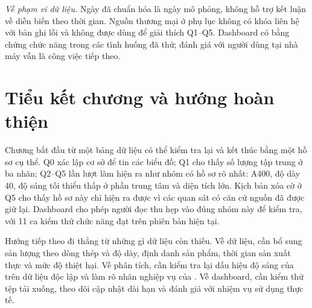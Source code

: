 \emph{Về phạm vi dữ liệu.} Ngày đã chuẩn hóa là ngày mô phỏng, không hỗ trợ kết luận về diễn biến theo thời gian. Nguồn thương mại ở phụ lục không có khóa liên hệ với bản ghi lỗi và không được dùng để giải thích Q1--Q5. Dashboard có bằng chứng chức năng trong các tình huống đã thử; đánh giá với người dùng tại nhà máy vẫn là công việc tiếp theo.

\section{Tiểu kết chương và hướng hoàn thiện}

Chương bắt đầu từ một bảng dữ liệu có thể kiểm tra lại và kết thúc bằng một hồ sơ cụ thể. Q0 xác lập cơ sở để tin các biểu đồ; Q1 cho thấy số lượng tập trung ở ba nhãn; Q2--Q5 lần lượt làm hiện ra  như nhóm có hồ sơ rõ nhất: A400, độ dày 40, độ sáng tối thiểu thấp ở phần trung tâm và diện tích lớn. Kịch bản xóa cờ ở Q5 cho thấy hồ sơ này chỉ hiện ra được vì các quan sát có căn cứ nguồn đã được giữ lại. Dashboard cho phép người đọc thu hẹp vào đúng nhóm này để kiểm tra, với 11 ca kiểm thử chức năng đạt trên phiên bản hiện tại.

Hướng tiếp theo đi thẳng từ những gì dữ liệu còn thiếu. Về dữ liệu, cần bổ sung sản lượng theo dòng thép và độ dày, định danh sản phẩm, thời gian sản xuất thực và mức độ thiệt hại. Về phân tích, cần kiểm tra lại dấu hiệu độ sáng của  trên dữ liệu độc lập và làm rõ nhãn nghiệp vụ của . Về dashboard, cần kiểm thử tệp tải xuống, theo dõi cập nhật dài hạn và đánh giá với nhiệm vụ sử dụng thực tế.
